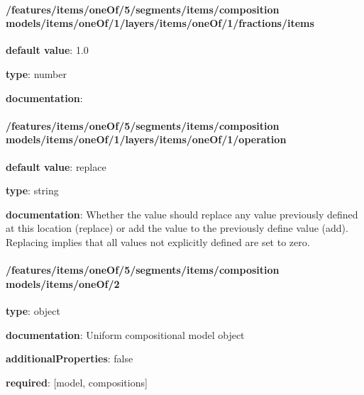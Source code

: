 \begin{itemized}
\paragraph{/features/items/oneOf/5/segments/items/composition models/items/oneOf/1/layers/items/oneOf/1/fractions/items} \begin{itemized}
\item {\bf default value}: 1.0
\item {\bf type}: number
\item {\bf documentation}: 
\end{itemized}\end{itemized}\paragraph{/features/items/oneOf/5/segments/items/composition models/items/oneOf/1/layers/items/oneOf/1/operation} \begin{itemized}
\item {\bf default value}: replace
\item {\bf type}: string
\item {\bf documentation}: Whether the value should replace any value previously defined at this location (replace) or add the value to the previously define value (add). Replacing implies that all values not explicitly defined are set to zero.
\end{itemized}\paragraph{/features/items/oneOf/5/segments/items/composition models/items/oneOf/2} \begin{itemized}
\item {\bf type}: object
\item {\bf documentation}: Uniform compositional model object
\item {\bf additionalProperties}: false
\item {\bf required}: [model, compositions]\end{itemized}
